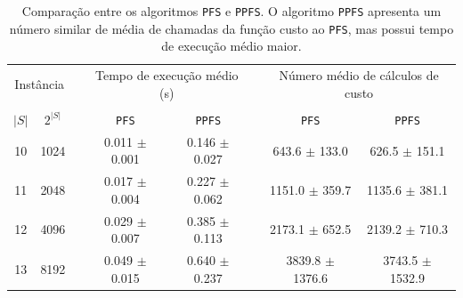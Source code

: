 \documentclass[12pt]{article}
\newcommand{\algname}[1]{\texttt{#1}}
\begin{document}
\begin{table}
\centering
\footnotesize
\caption{Comparação entre os algoritmos \algname{PFS} e \algname{PPFS}.
O algoritmo \algname{PPFS} apresenta um número similar de média de 
chamadas da função custo ao \algname{PFS}, mas possui tempo de execução 
médio maior.}
\label{tab:ppfs_vs_pfs}
\begin{tabular}{cc c cc c cc}
\toprule
\multicolumn{2}{c}{Instância} & \phantom{} & \multicolumn{2}{c}{Tempo de execução médio (s)} & \phantom{} & \multicolumn{2}{c}{Número médio de cálculos de custo} \\
\cline{1-2}\cline{4-5}\cline{7-8}\\
$|S|$ & $2^{|S|}$ && \algname{PFS} & \algname{PPFS} && \algname{PFS} & \algname{PPFS} \\
10 &    1024 && 0.011 $\pm$ 0.001 & 0.146 $\pm$ 0.027 && 643.6 $\pm$ 133.0 & 626.5 $\pm$ 151.1 \\
11 &    2048 && 0.017 $\pm$ 0.004 & 0.227 $\pm$ 0.062 && 1151.0 $\pm$ 359.7 & 1135.6 $\pm$ 381.1 \\
12 &    4096 && 0.029 $\pm$ 0.007 & 0.385 $\pm$ 0.113 && 2173.1 $\pm$ 652.5 & 2139.2 $\pm$ 710.3 \\
13 &    8192 && 0.049 $\pm$ 0.015 & 0.640 $\pm$ 0.237 && 3839.8 $\pm$ 1376.6 & 3743.5 $\pm$ 1532.9 \\

\end{tabular}
\end{table}
\end{document}
